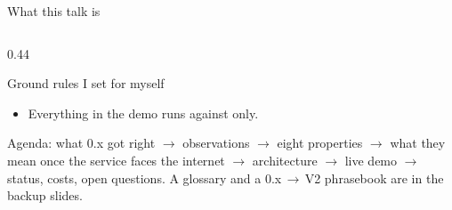 \begin{frame}{What this talk is}
\begin{columns}[T]
\begin{column}{0.44\textwidth}
\begin{block}{Ground rules I set for myself}
\begin{itemize}
                    \item Everything in the demo runs against  only.
                \end{itemize}
            \end{block}
            \vspace{0.2cm}
            {\small\color{qsgray} Agenda: what 0.x got right $\rightarrow$ observations $\rightarrow$
            eight properties $\rightarrow$ what they mean once the service faces the internet $\rightarrow$
            architecture $\rightarrow$ live demo $\rightarrow$ status, costs, open questions.
            A glossary and a 0.x\,$\rightarrow$\,V2 phrasebook are in the backup slides.\par}
        \end{column}
    \end{columns}
\end{frame}

